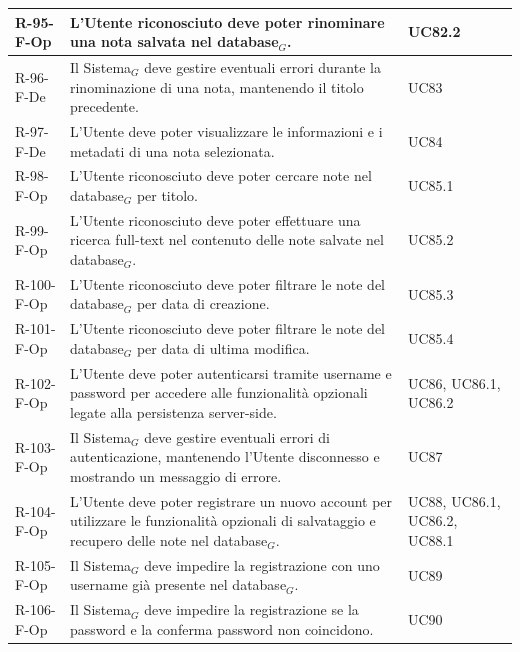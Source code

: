 \documentclass[a4paper, 10pt]{article}
\begin{document}
\begin{longtable}{|p{2.2cm}|p{7.5cm}|p{4cm}|}
R-95-F-Op & L'Utente riconosciuto deve poter rinominare una nota salvata nel database$_G$. & UC82.2 \\ \hline

R-96-F-De & Il Sistema$_G$ deve gestire eventuali errori durante la rinominazione di una nota, mantenendo il titolo precedente. & UC83 \\ \hline

R-97-F-De & L'Utente deve poter visualizzare le informazioni e i metadati di una nota selezionata. & UC84 \\ \hline

R-98-F-Op & L'Utente riconosciuto deve poter cercare note nel database$_G$ per titolo. & UC85.1 \\ \hline

R-99-F-Op & L'Utente riconosciuto deve poter effettuare una ricerca full-text nel contenuto delle note salvate nel database$_G$. & UC85.2 \\ \hline

R-100-F-Op & L'Utente riconosciuto deve poter filtrare le note del database$_G$ per data di creazione. & UC85.3 \\ \hline

R-101-F-Op & L'Utente riconosciuto deve poter filtrare le note del database$_G$ per data di ultima modifica. & UC85.4 \\ \hline

R-102-F-Op & L'Utente deve poter autenticarsi tramite username e password per accedere alle funzionalità opzionali legate alla persistenza server-side. & UC86, UC86.1, UC86.2 \\ \hline

R-103-F-Op & Il Sistema$_G$ deve gestire eventuali errori di autenticazione, mantenendo l'Utente disconnesso e mostrando un messaggio di errore. & UC87 \\ \hline

R-104-F-Op & L'Utente deve poter registrare un nuovo account per utilizzare le funzionalità opzionali di salvataggio e recupero delle note nel database$_G$. & UC88, UC86.1, UC86.2, UC88.1 \\ \hline

R-105-F-Op & Il Sistema$_G$ deve impedire la registrazione con uno username già presente nel database$_G$. & UC89 \\ \hline

R-106-F-Op & Il Sistema$_G$ deve impedire la registrazione se la password e la conferma password non coincidono. & UC90 \\ \hline


\end{longtable}
\end{document}
